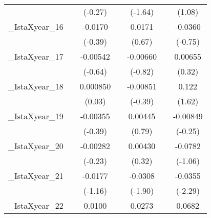{\begin{tabular}{l*{6}{c}}
            &                     &     (-0.27)         &                     &     (-1.64)         &                     &      (1.08)         \\
[1em]
\_IstaXyear\_16&                     &     -0.0170         &                     &      0.0171         &                     &     -0.0360         \\
            &                     &     (-0.39)         &                     &      (0.67)         &                     &     (-0.75)         \\
[1em]
\_IstaXyear\_17&                     &    -0.00542         &                     &    -0.00660         &                     &     0.00655         \\
            &                     &     (-0.64)         &                     &     (-0.82)         &                     &      (0.32)         \\
[1em]
\_IstaXyear\_18&                     &    0.000850         &                     &    -0.00851         &                     &       0.122         \\
            &                     &      (0.03)         &                     &     (-0.39)         &                     &      (1.62)         \\
[1em]
\_IstaXyear\_19&                     &    -0.00355         &                     &     0.00445         &                     &    -0.00849         \\
            &                     &     (-0.39)         &                     &      (0.79)         &                     &     (-0.25)         \\
[1em]
\_IstaXyear\_20&                     &    -0.00282         &                     &     0.00430         &                     &     -0.0782         \\
            &                     &     (-0.23)         &                     &      (0.32)         &                     &     (-1.06)         \\
[1em]
\_IstaXyear\_21&                     &     -0.0177         &                     &     -0.0308         &                     &     -0.0355\sym{*}  \\
            &                     &     (-1.16)         &                     &     (-1.90)         &                     &     (-2.29)         \\
[1em]
\_IstaXyear\_22&                     &      0.0100         &                     &      0.0273         &                     &      0.0682         \\

\end{tabular}}
